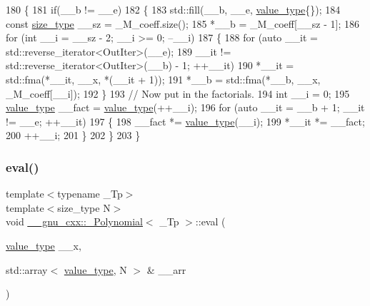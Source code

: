 \begin{DoxyCode}
180       \{
181         \textcolor{keywordflow}{if}(\_\_b != \_\_e)
182           \{
183             std::fill(\_\_b, \_\_e, \hyperlink{class____gnu__cxx_1_1__Polynomial_a725563351f50e76084a7a016c06f8a53}{value\_type}\{\});
184             \textcolor{keyword}{const} \hyperlink{class____gnu__cxx_1_1__Polynomial_a6afe219c123c7a2fdc5abac8a6639053}{size\_type} \_\_sz = \_M\_coeff.size();
185             *\_\_b = \_M\_coeff[\_\_sz - 1];
186             \textcolor{keywordflow}{for} (\textcolor{keywordtype}{int} \_\_i = \_\_sz - 2; \_\_i >= 0; --\_\_i)
187               \{
188                 \textcolor{keywordflow}{for} (\textcolor{keyword}{auto} \_\_it = std::reverse\_iterator<OutIter>(\_\_e);
189                      \_\_it != std::reverse\_iterator<OutIter>(\_\_b) - 1; ++\_\_it)
190                   *\_\_it = std::fma(*\_\_it, \_\_x, *(\_\_it + 1));
191                 *\_\_b = std::fma(*\_\_b, \_\_x, \_M\_coeff[\_\_i]);
192               \}
193             \textcolor{comment}{//  Now put in the factorials.}
194             \textcolor{keywordtype}{int} \_\_i = 0;
195             \hyperlink{class____gnu__cxx_1_1__Polynomial_a725563351f50e76084a7a016c06f8a53}{value\_type} \_\_fact = \hyperlink{class____gnu__cxx_1_1__Polynomial_a725563351f50e76084a7a016c06f8a53}{value\_type}(++\_\_i);
196             \textcolor{keywordflow}{for} (\textcolor{keyword}{auto} \_\_it = \_\_b + 1; \_\_it != \_\_e; ++\_\_it)
197               \{
198                 \_\_fact *= \hyperlink{class____gnu__cxx_1_1__Polynomial_a725563351f50e76084a7a016c06f8a53}{value\_type}(\_\_i);
199                 *\_\_it *= \_\_fact;
200                 ++\_\_i;
201               \}
202           \}
203       \}
\end{DoxyCode}
\mbox{\label{class____gnu__cxx_1_1__Polynomial_a3c3b539828301eef5385bc5b230a844a}} 
\subsubsection{\texorpdfstring{eval()}{eval()}\hspace{0.1cm}{\footnotesize\ttfamily [3/4]}}
{\footnotesize\ttfamily template$<$typename \+\_\+\+Tp$>$ \\
template$<$size\+\_\+type N$>$ \\
void \hyperlink{class____gnu__cxx_1_1__Polynomial}{\+\_\+\+\_\+gnu\+\_\+cxx\+::\+\_\+\+Polynomial}$<$ \+\_\+\+Tp $>$\+::eval (\begin{DoxyParamCaption}\item[{\hyperlink{class____gnu__cxx_1_1__Polynomial_a725563351f50e76084a7a016c06f8a53}{value\+\_\+type}}]{\+\_\+\+\_\+x,  }\item[{std\+::array$<$ \hyperlink{class____gnu__cxx_1_1__Polynomial_a725563351f50e76084a7a016c06f8a53}{value\+\_\+type}, N $>$ \&}]{\+\_\+\+\_\+arr }\end{DoxyParamCaption})}

